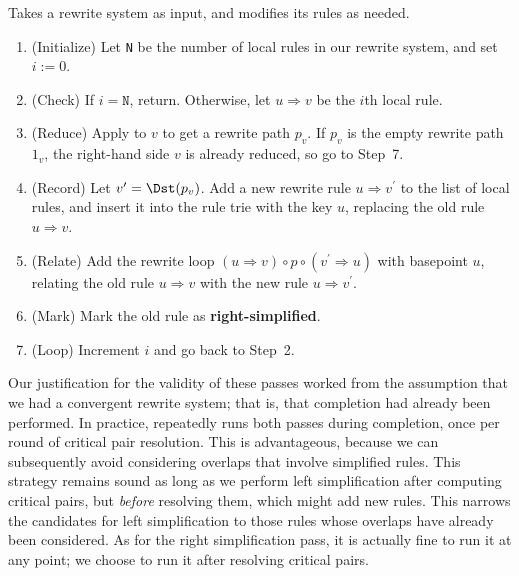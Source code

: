 \documentclass[../generics]{subfiles}
\begin{document}
\begin{algorithm}\label{right simplification}
Takes a rewrite system as input, and modifies its rules as needed.
\begin{enumerate}
\item (Initialize) Let \texttt{N} be the number of local rules in our rewrite system, and set $i:=0$.
\item (Check) If $i=\texttt{N}$, return. Otherwise, let $u\Rightarrow v$ be the $i$th local rule.
\item (Reduce) Apply  to $v$ to get a rewrite path $p_v$. If $p_v$ is the empty rewrite path $1_{v}$, the right-hand side $v$ is already reduced, so go to Step~7.
\item (Record) Let $v^\prime=\Dst(p_v)$. Add a new rewrite rule $u\Rightarrow v^\prime$ to the list of local rules, and insert it into the rule trie with the key $u$, replacing the old rule $u\Rightarrow v$.
\item (Relate) Add the rewrite loop $(u\Rightarrow v)\circ p\circ(v^\prime\Rightarrow u)$ with basepoint $u$, relating the old rule $u\Rightarrow v$ with the new rule $u\Rightarrow v^\prime$.
\item (Mark) Mark the old rule as \textbf{right-simplified}.
\item (Loop) Increment $i$ and go back to Step~2.
\end{enumerate}
\end{algorithm}

Our justification for the validity of these passes worked from the assumption that we had a convergent rewrite system; that is, that completion had already been performed. In practice,  repeatedly runs both passes during completion, once per round of critical pair resolution. This is advantageous, because we can subsequently avoid considering overlaps that involve simplified rules. This strategy remains sound as long as we perform left simplification after computing critical pairs, but \emph{before} resolving them, which might add new rules. This narrows the candidates for left simplification to those rules whose overlaps have already been considered. As for the right simplification pass, it is actually fine to run it at any point; we choose to run it after resolving critical pairs.
\end{document}
